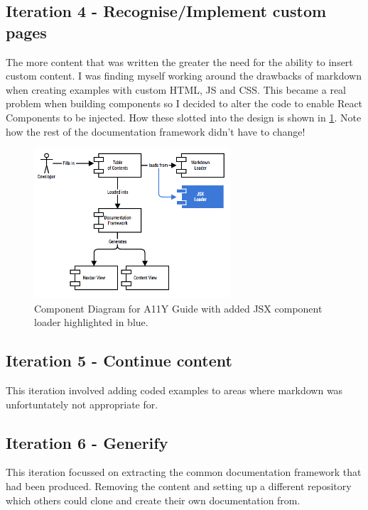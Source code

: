 \subsection{Iteration 4 - Recognise/Implement custom pages}
\label{sec:iteration_4}
The more content that was written the greater the need for the ability to
insert custom content. I was finding myself working around the drawbacks of
markdown when creating examples with custom HTML, JS and CSS. This became a
real problem when building components so I decided to alter the code to
enable React Components to be injected. How these slotted into the design is
shown in \ref{fig:allycomponent_2}. Note how the rest of the documentation
framework didn't have to change!

\begin{figure}[H]
\centering
\includegraphics[width=0.65\textwidth]{figures/documentation_design_2}
\captionsetup{justification=centering}
\caption[Short figure name.]{Component Diagram for A11Y Guide with added JSX
component loader highlighted in blue.
\label{fig:allycomponent_2}}
\end{figure}

\subsection{Iteration 5 - Continue content}
This iteration involved adding coded examples to areas where markdown was
unfortuntately not appropriate for.

\subsection{Iteration 6 - Generify}
This iteration focussed on extracting the common documentation framework that
had been produced. Removing the content and setting up a different repository
which others could clone and create their own documentation from.

